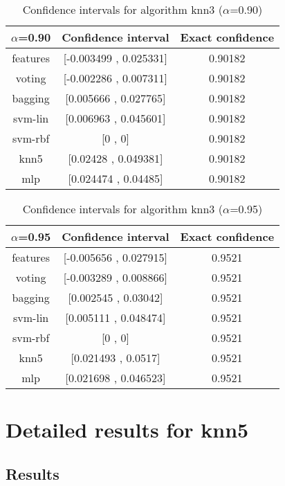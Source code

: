 \documentclass[a4paper,10pt]{article}
\begin{document}
\begin{table}[!htp]
\centering\small
\begin{tabular}{
|c|c|c|}
\hline
 $\alpha$=0.90 & Confidence interval & Exact confidence \\ \hline 
features & [-0.003499 , 0.025331] & 0.90182\\ \hline 
voting & [-0.002286 , 0.007311] & 0.90182\\ \hline 
bagging & [0.005666 , 0.027765] & 0.90182\\ \hline 
svm-lin & [0.006963 , 0.045601] & 0.90182\\ \hline 
svm-rbf & [0 , 0] & 0.90182\\ \hline 
knn5 & [0.02428 , 0.049381] & 0.90182\\ \hline 
mlp & [0.024474 , 0.04485] & 0.90182\\ \hline 

\end{tabular}
\caption{Confidence intervals for algorithm knn3 ($\alpha$=0.90)}
\end{table}
\begin{table}[!htp]
\centering\small
\begin{tabular}{
|c|c|c|}
\hline
 $\alpha$=0.95 & Confidence interval & Exact confidence \\ \hline 
features & [-0.005656 , 0.027915] & 0.9521\\ \hline 
voting & [-0.003289 , 0.008866] & 0.9521\\ \hline 
bagging & [0.002545 , 0.03042] & 0.9521\\ \hline 
svm-lin & [0.005111 , 0.048474] & 0.9521\\ \hline 
svm-rbf & [0 , 0] & 0.9521\\ \hline 
knn5 & [0.021493 , 0.0517] & 0.9521\\ \hline 
mlp & [0.021698 , 0.046523] & 0.9521\\ \hline 

\end{tabular}
\caption{Confidence intervals for algorithm knn3 ($\alpha$=0.95)}
\end{table}

 \clearpage 


\section{Detailed results for knn5}


\subsection{Results}
\end{document}
